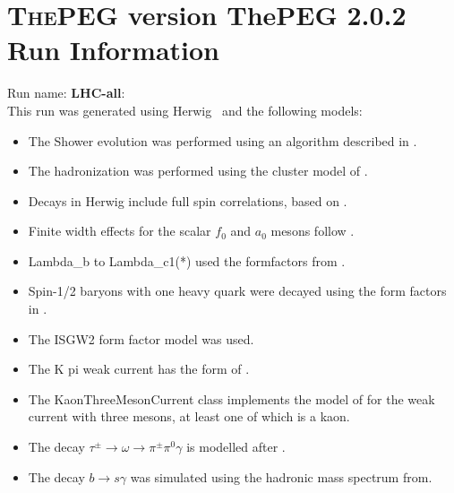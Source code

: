 \documentclass{article}
\begin{document}
\appendix
\section[xxx]{\textsc{ThePEG} version ThePEG 2.0.2 \cite{ThePEG} Run Information}
Run name: \textbf{LHC-all}:\\
This run was generated using Herwig~\cite{Bahr:2008pv} and the following models:
\begin{itemize}
\item The Shower evolution was performed using an algorithm described in \cite{Marchesini:1983bm,Marchesini:1987cf,Gieseke:2003rz,Bahr:2008pv}.
\item The hadronization was performed using the cluster model of \cite{Webber:1983if}.
\item Decays in Herwig include full spin correlations, based on \cite{Richardson:2001df}.
\item Finite width effects for the scalar $f_0$ and $a_0$ mesons follow \cite{Flatte:1976xu}.
\item Lambda_b to Lambda_c1(*) used the formfactors from \cite{Huang:2000xw}.
\item Spin-1/2 baryons with one heavy quark were decayed using the form factors in \cite{Singleton:1990ye}.
\item The ISGW2 form factor model \cite{Scora:1995ty} was used.
\item The K pi weak current has the form of \cite{Finkemeier:1996dh}.
\item The KaonThreeMesonCurrent class implements the model of \cite{Finkemeier:1995sr} for the weak current with three mesons, at least one of which is a kaon.
\item The decay $\tau^\pm \to \omega \to \pi^\pm \pi^0 \gamma$ is modelled after \cite{Jadach:1993hs}.
\item The decay $b\to s\gamma$ was simulated using the hadronic mass spectrum from\cite{Kagan:1998ym}.


\end{itemize}
\end{document}
